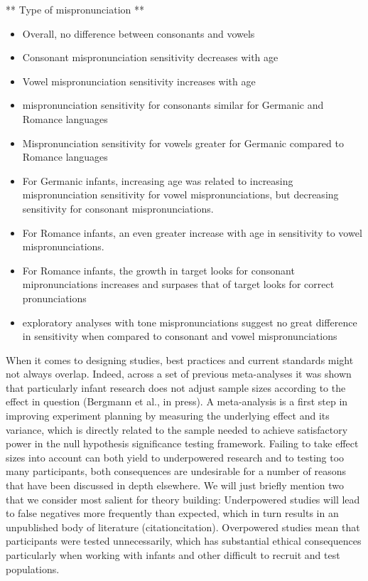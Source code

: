 \documentclass[man]{apa6}
\providecommand{\tightlist}{%
  \setlength{\itemsep}{0pt}\setlength{\parskip}{0pt}}
\theoremstyle{definition}
\theoremstyle{definition}
\theoremstyle{definition}
\theoremstyle{remark}
\begin{document}
** Type of mispronunciation **

\begin{itemize}
\tightlist
\item
  Overall, no difference between consonants and vowels
\item
  Consonant mispronunciation sensitivity decreases with age
\item
  Vowel mispronunciation sensitivity increases with age
\item
  mispronunciation sensitivity for consonants similar for Germanic and
  Romance languages
\item
  Mispronunciation sensitivity for vowels greater for Germanic compared
  to Romance languages
\item
  For Germanic infants, increasing age was related to increasing
  mispronunciation sensitivity for vowel mispronunciations, but
  decreasing sensitivity for consonant mispronunciations.
\item
  For Romance infants, an even greater increase with age in sensitivity
  to vowel mispronunciations.
\item
  For Romance infants, the growth in target looks for consonant
  mipronunciations increases and surpases that of target looks for
  correct pronunciations
\item
  exploratory analyses with tone mispronunciations suggest no great
  difference in sensitivity when compared to consonant and vowel
  mispronunciations
\end{itemize}

When it comes to designing studies, best practices and current standards
might not always overlap. Indeed, across a set of previous meta-analyses
it was shown that particularly infant research does not adjust sample
sizes according to the effect in question (Bergmann et al., in press). A
meta-analysis is a first step in improving experiment planning by
measuring the underlying effect and its variance, which is directly
related to the sample needed to achieve satisfactory power in the null
hypothesis significance testing framework. Failing to take effect sizes
into account can both yield to underpowered research and to testing too
many participants, both consequences are undesirable for a number of
reasons that have been discussed in depth elsewhere. We will just
briefly mention two that we consider most salient for theory building:
Underpowered studies will lead to false negatives more frequently than
expected, which in turn results in an unpublished body of literature
(citationcitation). Overpowered studies mean that participants were
tested unnecessarily, which has substantial ethical consequences
particularly when working with infants and other difficult to recruit
and test populations.
\end{document}
